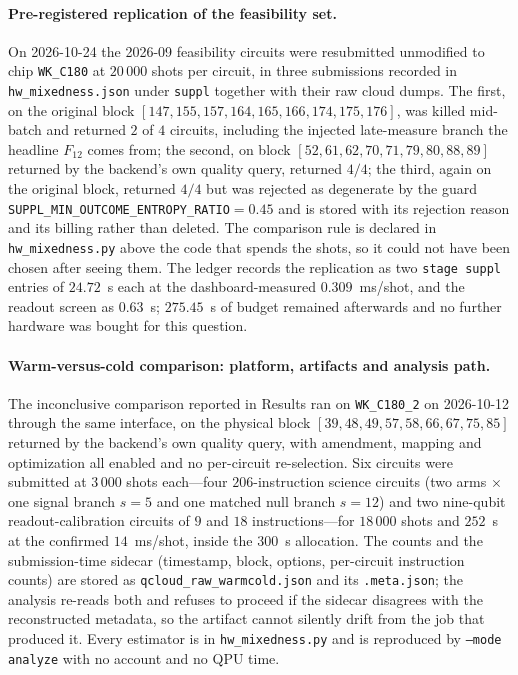\documentclass[aps,prxquantum,reprint,superscriptaddress]{revtex4-2}
\begin{document}
\paragraph{Pre-registered replication of the feasibility set.}
On 2026-10-24 the 2026-09 feasibility circuits were resubmitted unmodified to
chip \texttt{WK\_C180} at $20\,000$ shots per circuit, in three submissions
recorded in \texttt{hw\_mixedness.json} under \texttt{suppl} together with their
raw cloud dumps. The first, on the original block
$[147,155,157,164,165,166,174,175,176]$, was killed mid-batch and returned $2$ of
$4$ circuits, including the injected late-measure branch the headline $F_{12}$
comes from; the second, on block $[52,61,62,70,71,79,80,88,89]$ returned by the
backend's own quality query, returned $4/4$; the third, again on the original
block, returned $4/4$ but was rejected as degenerate by the guard
\texttt{SUPPL\_MIN\_OUTCOME\_ENTROPY\_RATIO}$=0.45$ and is stored with its
rejection reason and its billing rather than deleted. The comparison rule is
declared in \texttt{hw\_mixedness.py} above the code that spends the shots, so it
could not have been chosen after seeing them. The ledger records the replication
as two \texttt{stage suppl} entries of $24.72$~s each at the dashboard-measured
$0.309$~ms/shot, and the readout screen as $0.63$~s; $275.45$~s of budget remained
afterwards and no further hardware was bought for this question.

\paragraph{Warm-versus-cold comparison: platform, artifacts and analysis path.}
The inconclusive comparison reported in Results ran on \texttt{WK\_C180\_2} on
2026-10-12 through the same interface, on the physical block
$[39,48,49,57,58,66,67,75,85]$ returned by the backend's own quality query, with
amendment, mapping and optimization all enabled and no per-circuit re-selection.
Six circuits were submitted at $3\,000$ shots each---four $206$-instruction
science circuits (two arms $\times$ one signal branch $s{=}5$ and one matched
null branch $s{=}12$) and two nine-qubit readout-calibration circuits of $9$ and
$18$ instructions---for $18\,000$ shots and $252$~s at the confirmed
$14$~ms/shot, inside the $300$~s allocation. The counts and the submission-time
sidecar (timestamp, block, options, per-circuit instruction counts) are stored as
\texttt{qcloud\_raw\_warmcold.json} and its \texttt{.meta.json}; the analysis
re-reads both and refuses to proceed if the sidecar disagrees with the
reconstructed metadata, so the artifact cannot silently drift from the job that
produced it. Every estimator is in \texttt{hw\_mixedness.py} and is reproduced by
\texttt{--mode analyze} with no account and no QPU time.
\end{document}
